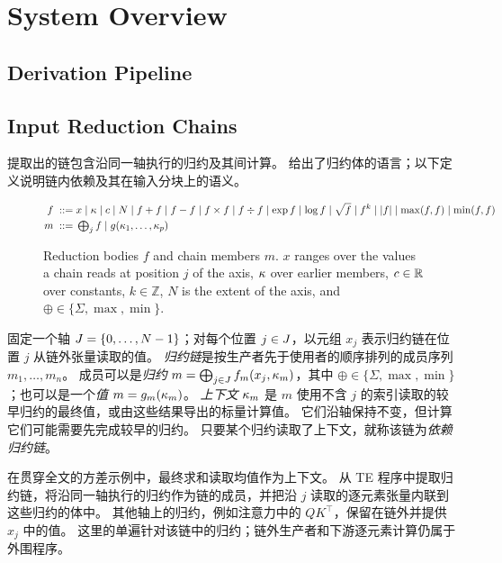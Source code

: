 \section{System Overview}
\label{sec:chains}

\subsection{Derivation Pipeline}



\subsection{Input Reduction Chains}
\label{sec:input-chains}

提取出的链包含沿同一轴执行的归约及其间计算。
 给出了归约体的语言；以下定义说明链内依赖及其在输入分块上的语义。

\begin{figure}[htbp]
\small
\begin{align*}
f \;::=\;& x \mid \kappa \mid c \mid N
 \mid f + f \mid f - f \mid f \times f \mid f \div f
 \mid \exp f \mid \log f \mid \sqrt{f} \mid f^{k} \mid |f| \mid \max(f,f) \mid \min(f,f)\\
m \;::=\;& \textstyle\bigoplus_{j} f \mid g(\kappa_1,\dots,\kappa_p)
\end{align*}
\caption{Reduction bodies $f$ and chain members $m$. $x$ ranges over the values a chain reads at position $j$ of the axis, $\kappa$ over earlier members, $c\in\mathbb{R}$ over constants, $k\in\mathbb{Z}$, $N$ is the extent of the axis, and $\oplus\in\{\Sigma,\max,\min\}$.}
\label{fig:grammar}
\end{figure}

\begin{definition}
\label{def:chain}
固定一个轴 $J=\{0,\dots,N-1\}$；对每个位置 $j\in J$，以元组 $x_j$ 表示归约链在位置 $j$ 从链外张量读取的值。
\emph{归约链}是按生产者先于使用者的顺序排列的成员序列 $m_1,\dots,m_n$。
成员可以是\emph{归约} $m=\bigoplus_{j\in J} f_m(x_j,\kappa_m)$，其中 $\oplus\in\{\Sigma,\max,\min\}$；也可以是一个\emph{值} $m=g_m(\kappa_m)$。
\emph{上下文} $\kappa_m$ 是 $m$ 使用不含 $j$ 的索引读取的较早归约的最终值，或由这些结果导出的标量计算值。
它们沿轴保持不变，但计算它们可能需要先完成较早的归约。
只要某个归约读取了上下文，就称该链为\emph{依赖归约链}。
\end{definition}

在贯穿全文的方差示例中，最终求和读取均值作为上下文。
\sys 从 TE 程序中提取归约链，将沿同一轴执行的归约作为链的成员，并把沿 $j$ 读取的逐元素张量内联到这些归约的体中。
其他轴上的归约，例如注意力中的 $QK^\top$，保留在链外并提供 $x_j$ 中的值。
这里的单遍针对该链中的归约；链外生产者和下游逐元素计算仍属于外围程序。

